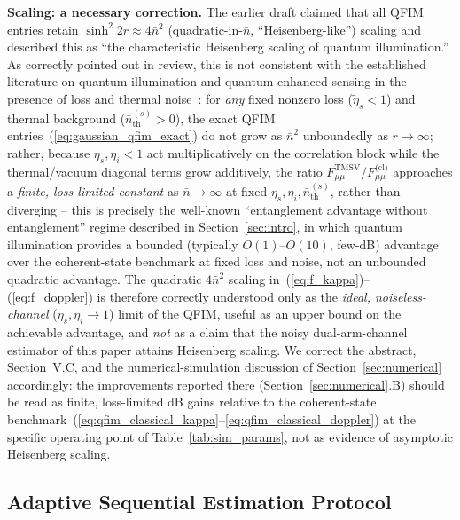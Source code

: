 \documentclass[journal]{IEEEtran}
\begin{document}
\textbf{Scaling: a necessary correction.} The earlier draft claimed that all QFIM entries retain $\sinh^2 2r\approx4\bar n^2$ (quadratic-in-$\bar n$, ``Heisenberg-like'') scaling and described this as ``the characteristic Heisenberg scaling of quantum illumination.'' As correctly pointed out in review, this is not consistent with the established literature on quantum illumination and quantum-enhanced sensing in the presence of loss and thermal noise~\cite{nair2020quantum,tan2008quantum}: for \emph{any} fixed nonzero loss ($\tilde\eta_s<1$) and thermal background ($\bar n_{\text{th}}^{(s)}>0$), the exact QFIM entries~(\ref{eq:gaussian_qfim_exact}) do not grow as $\bar n^2$ unboundedly as $r\to\infty$; rather, because $\eta_s,\eta_i<1$ act multiplicatively on the correlation block while the thermal/vacuum diagonal terms grow additively, the ratio $F^{\text{TMSV}}_{\mu\mu}/F^{\text{(cl)}}_{\mu\mu}$ approaches a \emph{finite, loss-limited constant} as $\bar n\to\infty$ at fixed $\eta_s,\eta_i,\bar n_{\text{th}}^{(s)}$, rather than diverging -- this is precisely the well-known ``entanglement advantage without entanglement'' regime described in Section~\ref{sec:intro}, in which quantum illumination provides a bounded (typically $O(1)$--$O(10)$, few-dB) advantage over the coherent-state benchmark at fixed loss and noise, not an unbounded quadratic advantage. The quadratic $4\bar n^2$ scaling in~(\ref{eq:f_kappa})--(\ref{eq:f_doppler}) is therefore correctly understood only as the \emph{ideal, noiseless-channel} ($\eta_s,\eta_i\to1$) limit of the QFIM, useful as an upper bound on the achievable advantage, and \emph{not} as a claim that the noisy dual-arm-channel estimator of this paper attains Heisenberg scaling. We correct the abstract, Section~V.C, and the numerical-simulation discussion of Section~\ref{sec:numerical} accordingly: the improvements reported there (Section~\ref{sec:numerical}.B) should be read as finite, loss-limited dB gains relative to the coherent-state benchmark~(\ref{eq:qfim_classical_kappa}--\ref{eq:qfim_classical_doppler}) at the specific operating point of Table~\ref{tab:sim_params}, not as evidence of asymptotic Heisenberg scaling.

\subsection{Adaptive Sequential Estimation Protocol}
\end{document}
